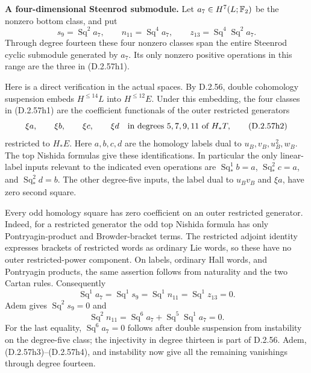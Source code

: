 \textbf{A four-dimensional Steenrod submodule.}
Let $a_7\in H^7(L;\mathbb F_2)$ be the nonzero bottom class, and put
\[
 s_9=\operatorname{Sq}^2a_7,\qquad
 n_{11}=\operatorname{Sq}^4a_7,\qquad
 z_{13}=\operatorname{Sq}^4\operatorname{Sq}^2a_7.
 \tag{D.2.57h1}
\]
Through degree fourteen these four nonzero classes span the entire
Steenrod cyclic submodule generated by $a_7$. Its only nonzero positive
operations in this range are the three in \textup{(D.2.57h1)}.

Here is a direct verification in the actual spaces. By D.2.56,
double cohomology suspension embeds $H^{\le14}L$ into $H^{\le12}E$.
Under this embedding, the four classes in
\textup{(D.2.57h1)} are the coefficient functionals of the outer
restricted generators
\[
 \xi a,\qquad \xi b,\qquad \xi c,\qquad \xi d
 \quad\hbox{in degrees }5,7,9,11\hbox{ of }H_*T,
 \tag{D.2.57h2}
\]
restricted to $H_*E$. Here $a,b,c,d$ are the homology labels dual
to $u_B,v_B,u_B^2,w_B$.
The top Nishida formulas
\cite[Chapter III, Theorem 1.3(3), pp.~217--218]{I_CohenLadaMay1976}
give these identifications. In particular the only linear-label
inputs relevant to the indicated even operations are
$\operatorname{Sq}_*^1b=a$,
$\operatorname{Sq}_*^2c=a$, and
$\operatorname{Sq}_*^2d=b$.
The other degree-five inputs, the label dual to $u_Bv_B$ and
$\xi a$, have zero second square.

Every odd homology square has zero coefficient on an outer restricted
generator. Indeed, for a restricted generator the odd top Nishida
formula has only Pontryagin-product and Browder-bracket terms.
The restricted adjoint identity expresses brackets of restricted
words as ordinary Lie words, so these have no outer restricted-power
component. On labels, ordinary Hall words, and Pontryagin products,
the same assertion follows from naturality and the two Cartan rules.
Consequently
\[
 \operatorname{Sq}^1a_7=\operatorname{Sq}^1s_9
 =\operatorname{Sq}^1n_{11}
 =\operatorname{Sq}^1z_{13}=0.
 \tag{D.2.57h3}
\]
Adem gives $\operatorname{Sq}^2s_9=0$ and
\[
 \operatorname{Sq}^2n_{11}
 =\operatorname{Sq}^6a_7+\operatorname{Sq}^5
       \operatorname{Sq}^1a_7=0.
 \tag{D.2.57h4}
\]
For the last equality, $\operatorname{Sq}^6a_7=0$ follows after
double suspension from instability on the degree-five class; the
injectivity in degree thirteen is part of D.2.56.
Adem, \textup{(D.2.57h3)--(D.2.57h4)}, and instability now give
all the remaining vanishings through degree fourteen.


